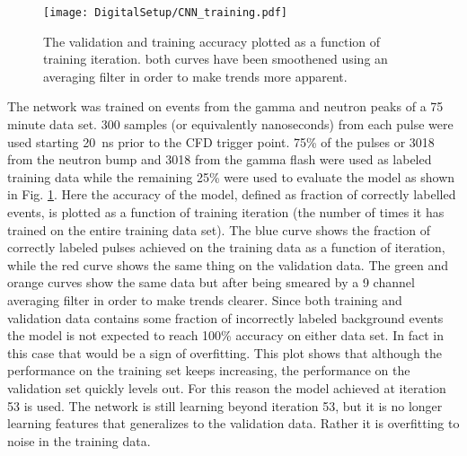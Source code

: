 \documentclass[main.tex]{subfiles}
\begin{document}
\begin{figure}[ht!]
    \centering
        \texttt{[image: DigitalSetup/CNN\_training.pdf]}
        \caption[Training and validation accuracy of the CNN]{The validation and training accuracy plotted as a function of training iteration. both curves have been smoothened using an averaging filter in order to make trends more apparent.}
    \label{fig:CNN_training} 
\end{figure}

The network was trained on events from the gamma and neutron peaks of a 75 minute data set. 300 samples (or equivalently nanoseconds) from each pulse were used starting \SI{20}{ns} prior to the CFD trigger point. 75\% of the pulses or 3018 from the neutron bump and 3018 from the gamma flash were used as labeled training data while the remaining 25\% were used to evaluate the model as shown in Fig. \ref{fig:CNN_training}. Here the accuracy of the model, defined as fraction of correctly labelled events, is plotted as a function of training iteration (the number of times it has trained on the entire training data set). The blue curve shows the fraction of correctly labeled pulses achieved on the training data as a function of iteration, while the red curve shows the same thing on the validation data. The green and orange curves show the same data but after being smeared by a 9 channel averaging filter in order to make trends clearer. Since both training and validation data contains some fraction of incorrectly labeled background events the model is not expected to reach 100\% accuracy on either data set. In fact in this case that would be a sign of overfitting. This plot shows that although the performance on the training set keeps increasing, the performance on the validation set quickly levels out. For this reason the model achieved at iteration 53 is used. The network is still learning beyond iteration 53, but it is no longer learning features that generalizes to the validation data. Rather it is overfitting to noise in the training data.
\end{document}

